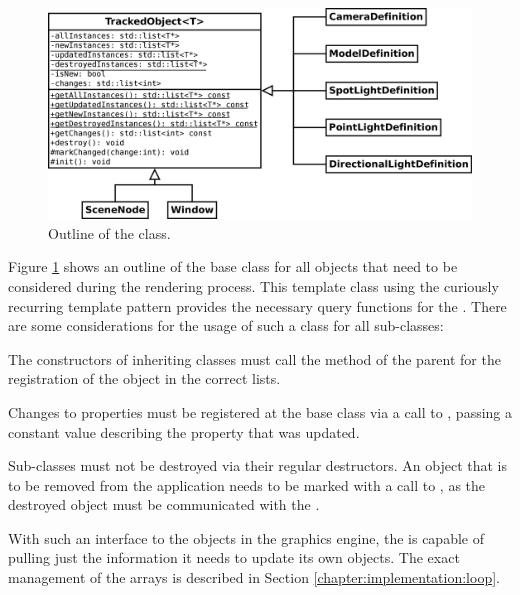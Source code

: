 	\begin{figure}[htbp]
		\centering
		\includegraphics[width=14cm]{images/TrackedObject.png}
		\caption{Outline of the  class.}
		\label{fig:TrackedObject}
	\end{figure}

	Figure \ref{fig:TrackedObject} shows an outline of the base class for all objects that need to be considered during the rendering process. This template class using the curiously recurring template pattern provides the necessary query functions for the . There are some considerations for the usage of such a class for all sub-classes:

	\begin{smalllist}
		\item The constructors of inheriting classes must call the  method of the parent for the registration of the object in the correct lists.
		\item Changes to properties must be registered at the base class via a call to , passing a constant value describing the property that was updated.
		\item Sub-classes must not be destroyed via their regular destructors. An object that is to be removed from the application needs to be marked with a call to , as the destroyed object must be communicated with the .
	\end{smalllist}

	With such an interface to the objects in the graphics engine, the  is capable of pulling just the information it needs to update its own objects. The exact management of the  arrays is described in Section \ref{chapter:implementation:loop}.

